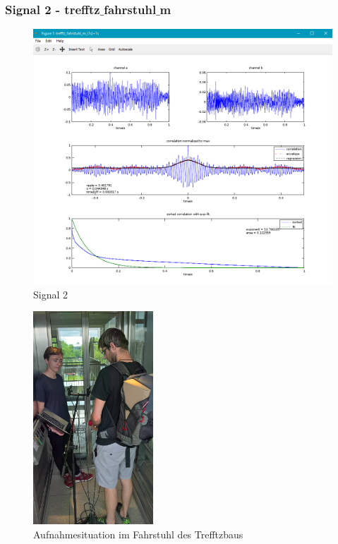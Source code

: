 \subsubsection{Signal 2 - trefftz$\_$fahrstuhl$\_$m}
\begin{figure}[ht!]
  \centering
  \includegraphics[scale=0.64]{img/trefftz_fahrstuhl_m}
  \caption{Signal 2}
  \label{figure3}
\end{figure}
\begin{figure}[ht!]
  \centering
  \includegraphics[width=0.4\textwidth]{img/fahrstuhl}
  \caption{Aufnahmesituation im Fahrstuhl des Trefftzbaus}
  \label{figure5}
\end{figure}

